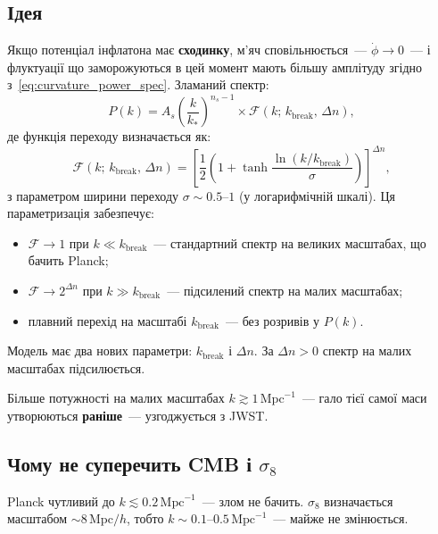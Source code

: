 \documentclass[12pt, a4paper]{article}
\begin{document}
\subsection{Ідея}

Якщо потенціал інфлатона має \textbf{сходинку}, м'яч сповільнюється~---
$\dot{\phi} \to 0$~--- і флуктуації що заморожуються в цей момент
мають більшу амплітуду згідно з~\eqref{eq:curvature_power_spec}.
Зламаний спектр:
\begin{equation}\label{eq:broken_spectrum}
  P(k) = A_s \left(\frac{k}{k_*}\right)^{n_s-1}
  \times \mathcal{F}(k;\, k_\mathrm{break},\, \Delta n),
\end{equation}
де функція переходу визначається як:
\begin{equation}\label{eq:F_def}
  \mathcal{F}(k;\, k_\mathrm{break},\, \Delta n)
  = \left[\frac{1}{2}\left(1 + \tanh\frac{\ln(k/k_\mathrm{break})}
    {\sigma}\right)\right]^{\!\Delta n},
\end{equation}
з параметром ширини переходу $\sigma \sim 0.5$--$1$ (у логарифмічній
шкалі). Ця параметризація забезпечує:
\begin{itemize}
  \item $\mathcal{F} \to 1$ при $k \ll k_\mathrm{break}$~---
        стандартний спектр на великих масштабах, що бачить Planck;
  \item $\mathcal{F} \to 2^{\Delta n}$ при $k \gg k_\mathrm{break}$~---
        підсилений спектр на малих масштабах;
  \item плавний перехід на масштабі $k_\mathrm{break}$~---
        без розривів у $P(k)$.
\end{itemize}
Модель має два нових параметри: $k_\mathrm{break}$ і $\Delta n$.
За $\Delta n > 0$ спектр на малих масштабах підсилюється.

Більше потужності на малих масштабах $k \gtrsim 1\,\mathrm{Mpc}^{-1}$~---
гало тієї самої маси утворюються \textbf{раніше}~--- узгоджується з JWST.

\subsection{Чому не суперечить CMB і $\sigma_8$}

Planck чутливий до $k \lesssim 0.2\,\mathrm{Mpc}^{-1}$~--- злом не бачить.
$\sigma_8$ визначається масштабом $\sim 8\,\mathrm{Mpc}/h$, тобто
$k \sim 0.1$--$0.5\,\mathrm{Mpc}^{-1}$~--- майже не змінюється.
\end{document}
